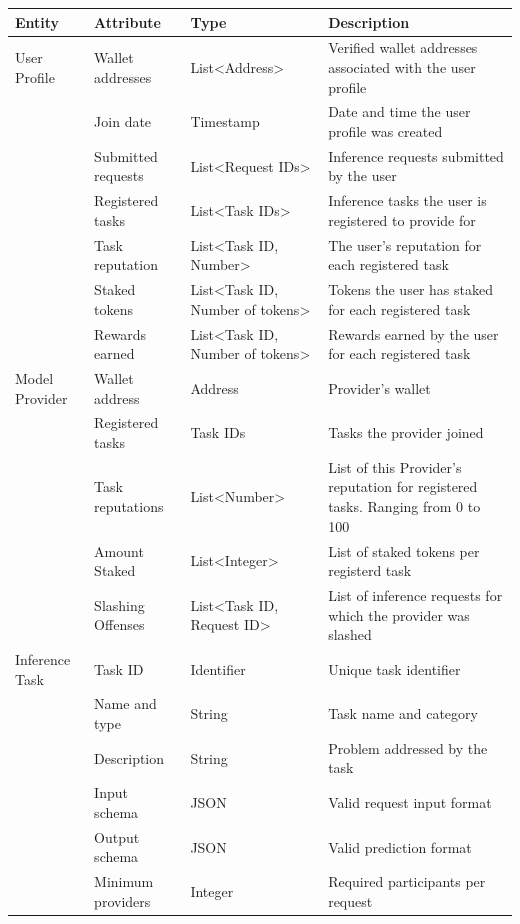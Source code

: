\documentclass[12pt]{article}
\begin{document}
\setlength{\tabcolsep}{3pt}
\begin{longtable}{p{} p{} p{} p{}}
\toprule
Entity & Attribute & Type & Description\\
\midrule
User Profile & Wallet addresses & List\textless{}Address\textgreater{} & Verified wallet addresses associated with the user profile\\
 & Join date & Timestamp & Date and time the user profile was created\\
 & Submitted requests & List\textless{}Request IDs\textgreater{} & Inference requests submitted by the user\\
 & Registered tasks & List\textless{}Task IDs\textgreater{} & Inference tasks the user is registered to provide for\\
 & Task reputation & List\textless{}Task ID, Number\textgreater{} & The user's reputation for each registered task\\
 & Staked tokens & List\textless{}Task ID, Number of tokens\textgreater{} & Tokens the user has staked for each registered task\\
 & Rewards earned & List\textless{}Task ID, Number of tokens\textgreater{} & Rewards earned by the user for each registered task\\
Model Provider & Wallet address & Address & Provider's wallet\\
 & Registered tasks & Task IDs & Tasks the provider joined\\
 & Task reputations & List\textless{}Number\textgreater{} & List of this Provider's reputation for registered tasks. Ranging from 0 to 100\\
 & Amount Staked & List\textless{}Integer\textgreater{} & List of staked tokens per registerd task\\
 & Slashing Offenses & List\textless{}Task ID, Request ID\textgreater{} & List of inference requests for which the provider was slashed\\
Inference Task & Task ID & Identifier & Unique task identifier\\
 & Name and type & String & Task name and category\\
 & Description & String & Problem addressed by the task\\
 & Input schema & JSON & Valid request input format\\
 & Output schema & JSON & Valid prediction format\\
 & Minimum providers & Integer & Required participants per request\\

\end{longtable}
\end{document}
